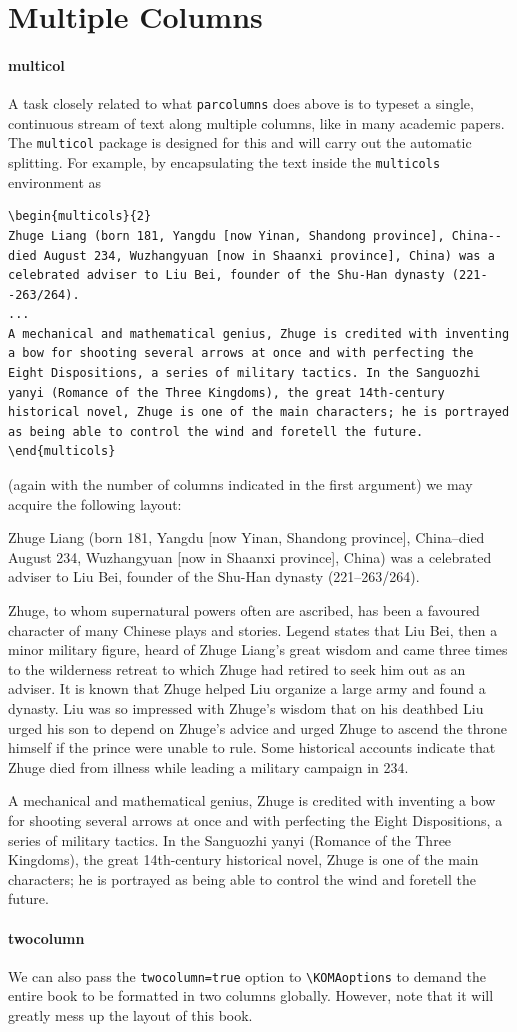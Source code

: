 \section{Multiple Columns}

\paragraph{multicol} A task closely related to what \verb|parcolumns| does above is to typeset a single, continuous stream of text along multiple columns, like in many academic papers. The \texttt{multicol} package is designed for this and will carry out the automatic splitting. For example, by encapsulating the text inside the \verb|multicols| environment as
\begin{lstlisting}
\begin{multicols}{2}
Zhuge Liang (born 181, Yangdu [now Yinan, Shandong province], China--died August 234, Wuzhangyuan [now in Shaanxi province], China) was a celebrated adviser to Liu Bei, founder of the Shu-Han dynasty (221--263/264).
...
A mechanical and mathematical genius, Zhuge is credited with inventing a bow for shooting several arrows at once and with perfecting the Eight Dispositions, a series of military tactics. In the Sanguozhi yanyi (Romance of the Three Kingdoms), the great 14th-century historical novel, Zhuge is one of the main characters; he is portrayed as being able to control the wind and foretell the future.
\end{multicols}
\end{lstlisting}
(again with the number of columns indicated in the first argument) we may acquire the following layout:
\begin{multicols}{2}
Zhuge Liang (born 181, Yangdu [now Yinan, Shandong province], China--died August 234, Wuzhangyuan [now in Shaanxi province], China) was a celebrated adviser to Liu Bei, founder of the Shu-Han dynasty (221--263/264).

Zhuge, to whom supernatural powers often are ascribed, has been a favoured character of many Chinese plays and stories. Legend states that Liu Bei, then a minor military figure, heard of Zhuge Liang’s great wisdom and came three times to the wilderness retreat to which Zhuge had retired to seek him out as an adviser. It is known that Zhuge helped Liu organize a large army and found a dynasty. Liu was so impressed with Zhuge’s wisdom that on his deathbed Liu urged his son to depend on Zhuge’s advice and urged Zhuge to ascend the throne himself if the prince were unable to rule. Some historical accounts indicate that Zhuge died from illness while leading a military campaign in 234.

A mechanical and mathematical genius, Zhuge is credited with inventing a bow for shooting several arrows at once and with perfecting the Eight Dispositions, a series of military tactics. In the Sanguozhi yanyi (Romance of the Three Kingdoms), the great 14th-century historical novel, Zhuge is one of the main characters; he is portrayed as being able to control the wind and foretell the future.
\end{multicols}


\paragraph{twocolumn} We can also pass the \verb|twocolumn=true| option to \texttt{\textbackslash KOMAoptions} to demand the entire book to be formatted in two columns globally. However, note that it will greatly mess up the layout of this book.